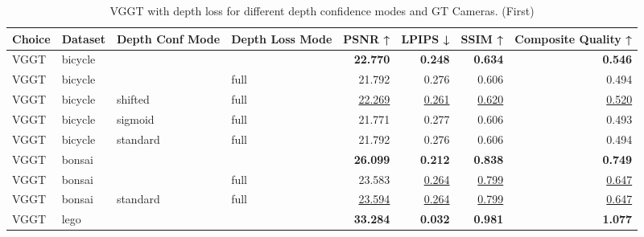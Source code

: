 \begin{table}[H]
\caption{VGGT with depth loss for different depth confidence modes and GT Cameras. (First)}
\label{tab:05_depth_conf_mode_gt_cams_first}
\centering
\scriptsize
\begin{tabular}{llllrrrr}
\toprule
Choice & Dataset & Depth Conf Mode & Depth Loss Mode & PSNR ↑ & LPIPS ↓ & SSIM ↑ & Composite Quality ↑ \\
\midrule
VGGT & bicycle &  &  & \textbf{22.770} & \textbf{0.248} & \textbf{0.634} & \textbf{0.546} \\
VGGT & bicycle &  & full & 21.792 & 0.276 & 0.606 & 0.494 \\
VGGT & bicycle & shifted & full & \underline{22.269} & \underline{0.261} & \underline{0.620} & \underline{0.520} \\
VGGT & bicycle & sigmoid & full & 21.771 & 0.277 & 0.606 & 0.493 \\
VGGT & bicycle & standard & full & 21.792 & 0.276 & 0.606 & 0.494 \\
\midrule
VGGT & bonsai &  &  & \textbf{26.099} & \textbf{0.212} & \textbf{0.838} & \textbf{0.749} \\
VGGT & bonsai &  & full & 23.583 & \underline{0.264} & \underline{0.799} & \underline{0.647} \\
VGGT & bonsai & standard & full & \underline{23.594} & \underline{0.264} & \underline{0.799} & \underline{0.647} \\
\midrule
VGGT & lego &  &  & \textbf{33.284} & \textbf{0.032} & \textbf{0.981} & \textbf{1.077} \\
\bottomrule
\end{tabular}
\end{table}